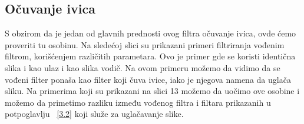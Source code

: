 \documentclass[a4paper,12pt,titlepage]{article}
\begin{document}
\subsection{Očuvanje ivica}%

S obzirom da je jedan od glavnih prednosti ovog filtra očuvanje ivica, ovde ćemo proveriti tu osobinu. Na sledećoj slici su prikazani primeri filtriranja vođenim filtrom, korišćenjem različitih parametara. Ovo je primer gde se koristi identična slika i kao ulaz i kao slika vodič. Na ovom primeru možemo da vidimo da se vođeni filter ponaša kao filter koji čuva ivice, iako je njegova namena da uglača sliku. 
Na primerima koji su prikazani na slici 13 možemo da uočimo ove osobine i možemo da primetimo razliku između vođenog filtra i filtara prikazanih u potpoglavlju ~\ref{3.2} koji služe za uglačavanje slike.
\end{document}
